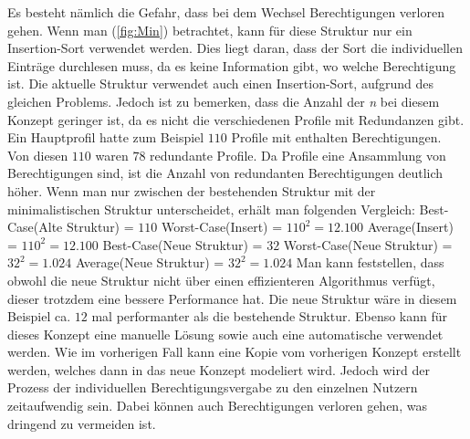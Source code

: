 Es besteht nämlich die Gefahr, dass bei dem Wechsel Berechtigungen verloren gehen.
\newline
\newline
Wenn man (\ref{fig:Min}) betrachtet, kann für diese Struktur nur ein Insertion-Sort verwendet werden.
Dies liegt daran, dass der Sort die individuellen Einträge durchlesen muss, da es keine Information gibt, wo welche Berechtigung ist.
Die aktuelle Struktur verwendet auch einen Insertion-Sort, aufgrund des gleichen Problems.
Jedoch ist zu bemerken, dass die Anzahl der \textit{n} bei diesem Konzept geringer ist, da es nicht die verschiedenen Profile mit Redundanzen gibt.
\newline
\newline
Ein Hauptprofil hatte zum Beispiel $110$ Profile mit enthalten Berechtigungen.
Von diesen $110$ waren $78$ redundante Profile.
Da Profile eine Ansammlung von Berechtigungen sind, ist die Anzahl von redundanten Berechtigungen deutlich höher.
Wenn man nur zwischen der bestehenden Struktur mit der minimalistischen Struktur unterscheidet, erhält man folgenden Vergleich:
\newline
\newline
Best-Case(Alte Struktur) = $110$
\newline
Worst-Case(Insert) = $110^2 = 12.100$
\newline
Average(Insert) = $110^2 = 12.100$
\newline
\newline
Best-Case(Neue Struktur) = $32$
\newline
Worst-Case(Neue Struktur) = $32^2 = 1.024$
\newline
Average(Neue Struktur) = $32^2 = 1.024$
\newline
\newline
Man kann feststellen, dass obwohl die neue Struktur nicht über einen effizienteren Algorithmus verfügt, dieser trotzdem eine bessere Performance hat.
Die neue Struktur wäre in diesem Beispiel ca. $12$ mal performanter als die bestehende Struktur.
\newline
\newline
Ebenso kann für dieses Konzept eine manuelle Lösung sowie auch eine automatische verwendet werden.
Wie im vorherigen Fall kann eine Kopie vom vorherigen Konzept erstellt werden, welches dann in das neue Konzept modeliert wird.
Jedoch wird der Prozess der individuellen Berechtigungsvergabe zu den einzelnen Nutzern zeitaufwendig sein.
Dabei können auch Berechtigungen verloren gehen, was dringend zu vermeiden ist.
\newline
